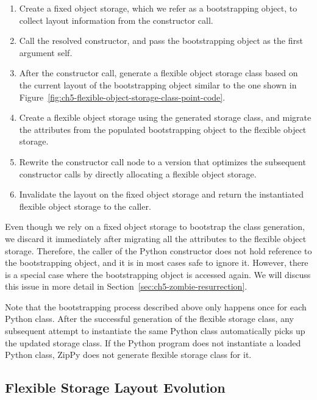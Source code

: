 \begin{enumerate}

\item Create a fixed object storage, which we refer as a bootstrapping object, to collect layout information from the constructor call.

\item Call the resolved constructor, and pass the bootstrapping object as the first argument \textsf{self}.

\item After the constructor call, generate a flexible object storage class based on the current layout of the bootstrapping object similar to the one shown in Figure~\ref{fig:ch5-flexible-object-storage-class-point-code}.

\item Create a flexible object storage using the generated storage class, and migrate the attributes from the populated bootstrapping object to the flexible object storage.

\item Rewrite the constructor call node to a version that optimizes the subsequent constructor calls by directly allocating a flexible object storage.

\item Invalidate the layout on the fixed object storage and return the instantiated flexible object storage to the caller.

\end{enumerate}

Even though we rely on a fixed object storage to bootstrap the class generation, we discard it immediately after migrating all the attributes to the flexible object storage.
Therefore, the caller of the Python constructor does not hold reference to the bootstrapping object, and it is in most cases safe to ignore it.
However, there is a special case where the bootstrapping object is accessed again.
We will discuss this issue in more detail in Section~\ref{sec:ch5-zombie-resurrection}.

Note that the bootstrapping process described above only happens once for each Python class.
After the successful generation of the flexible storage class, any subsequent attempt to instantiate the same Python class automatically picks up the updated storage class.
If the Python program does not instantiate a loaded Python class, ZipPy does not generate flexible storage class for it.

\subsection{Flexible Storage Layout Evolution}
\label{sec:ch5-flexible-storage-layout-evolution}

